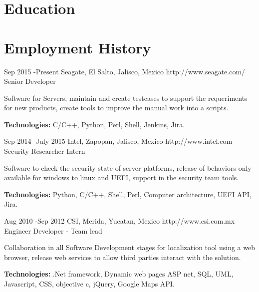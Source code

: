 \documentclass[10pt]{article} %
\begin{document}

\section{Education}





\section{Employment History}

\job
{Sep 2015 -}{Present}
{Seagate, El Salto, Jalisco, Mexico}
{http://www.seagate.com/}
{Senior Developer}
{Software for Servers, maintain and create testcases to support the requeriments for new products, create tools to improve the manual work into a scripts.\\
\rule{0mm}{5mm}\textbf{Technologies:} C/C++, Python, Perl, Shell, Jenkins, Jira.}


\job
{Sep 2014 -}{July 2015}
{Intel, Zapopan, Jalisco, Mexico}
{http://www.intel.com}
{Security Researcher Intern}
{Software to check the security state of server platforms, release of behaviors only available for windows to linux and UEFI, support in the security team tools.\\
\rule{0mm}{5mm}\textbf{Technologies:} Python, C/C++, Shell, Perl, Computer architecture, UEFI API, Jira.}

\job
{Aug 2010 -}{Sep 2012}
{CSI, Merida, Yucatan, Mexico}
{http://www.csi.com.mx}
{Engineer Developer - Team lead }
{Collaboration in all Software Development stages for localization tool using a web browser, release web services to allow third parties interact with the solution. \\
\rule{0mm}{5mm}\textbf{Technologies:} .Net framework, Dynamic web pages ASP net, SQL, UML, Javascript, CSS, objective c, jQuery, Google Maps API.
}
\end{document}
